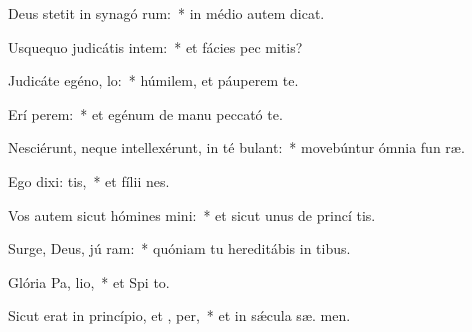 \item Deus stetit in synagó rum:~* in médio autem  dicat.
\item Usquequo judicátis intem:~* et fácies pec mitis?
\item Judicáte egéno,  lo:~* húmilem, et páuperem te.
\item Erí perem:~* et egénum de manu peccató te.
\item Nesciérunt, neque intellexérunt, in té bulant:~* movebúntur ómnia fun ræ.
\item Ego dixi:  tis,~* et fílii  nes.
\item Vos autem sicut hómines mini:~* et sicut unus de princí tis.
\item Surge, Deus, jú ram:~* quóniam tu hereditábis in  tibus.
\item Glória Pa,  lio,~* et Spi to.
\item Sicut erat in princípio, et ,  per,~* et in sǽcula sæ. men.
